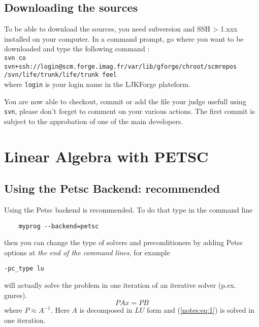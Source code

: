 \subsection{Downloading the sources}
\label{sec:download-sources}

To be able to download the \feel sources, you need subversion and SSH > 1.xxx
installed on your computer. In a command prompt, go where you want \feel to be
downloaded and type the following command :
\\ \verb|svn co svn+ssh://login@scm.forge.imag.fr/var/lib/gforge/chroot/scmrepos|
\\ \verb|/svn/life/trunk/life/trunk feel|
\\ where \verb|login| is your login name in the LJKForge plateform.

You are now able to checkout, commit or add the file your judge usefull using \verb|svn|, please don't forget to comment on your various actions. The first commit is subject to the approbation of one of the main developers.


\section{Linear Algebra with PETSC}

\subsection{Using the Petsc Backend: recommended}

Using the Petsc backend is recommended. To do that type in the command line
\begin{lstlisting}
    myprog --backend=petsc
  \end{lstlisting}
  then you can change the type of solvers and preconditioners by
  adding Petsc options at \emph{the end of the command lines}, for example
\begin{verbatim}
-pc_type lu
\end{verbatim}
  will actually solve the problem in one iteration of an iterative solver
  (p.ex. gmres).
  \begin{equation}
    \label{notes:eq:1}
    P A x = P B
  \end{equation}
  where $P \approx A^{-1}$. Here $A$ is decomposed in $LU$ form and
  (\ref{notes:eq:1}) is solved in one iteration.

